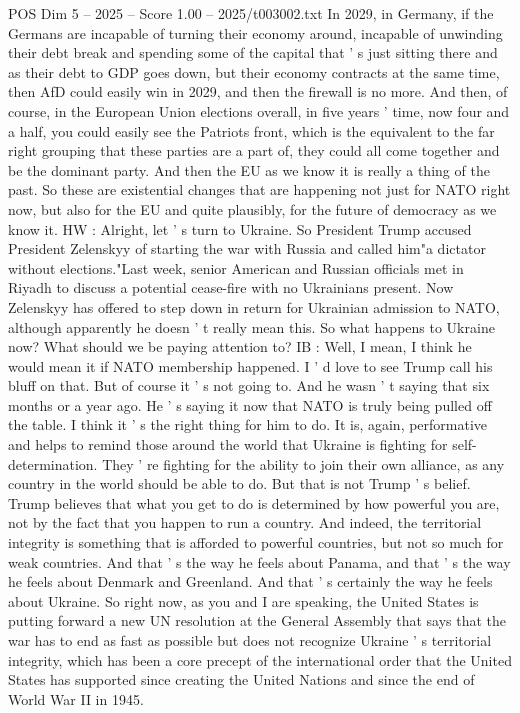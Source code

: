 \begin{textsample}{POS Dim 5 – 2025 – Score 1.00 – 2025/t003002.txt}
In 2029, in Germany, if the Germans are incapable of turning their economy around, incapable of unwinding their debt break and spending some of the capital that ' s just sitting there and as their debt to GDP goes down, but their economy contracts at the same time, then AfD could easily win in 2029, and then the firewall is no more.
And then, of course, in the European Union elections overall, in five years ' time, now four and a half, you could easily see the Patriots front, which is the equivalent to the far right grouping that these parties are a part of, they could all come together and be the dominant party.
And then the EU as we know it is really a thing of the past.
So these are existential changes that are happening not just for NATO right now, but also for the EU and quite plausibly, for the future of democracy as we know it.
HW : Alright, let ' s turn to Ukraine.
So President Trump accused President Zelenskyy of starting the war with Russia and called him"a dictator without elections."Last week, senior American and Russian officials met in Riyadh to discuss a potential cease-fire with no Ukrainians present.
Now Zelenskyy has offered to step down in return for Ukrainian admission to NATO, although apparently he doesn ' t really mean this.
So what happens to Ukraine now?
What should we be paying attention to?
IB : Well, I mean, I think he would mean it if NATO membership happened.
I ' d love to see Trump call his bluff on that.
But of course it ' s not going to.
And he wasn ' t saying that six months or a year ago.
He ' s saying it now that NATO is truly being pulled off the table.
I think it ' s the right thing for him to do.
It is, again, performative and helps to remind those around the world that Ukraine is fighting for self-determination.
They ' re fighting for the ability to join their own alliance, as any country in the world should be able to do.
But that is not Trump ' s belief.
Trump believes that what you get to do is determined by how powerful you are, not by the fact that you happen to run a country.
And indeed, the territorial integrity is something that is afforded to powerful countries, but not so much for weak countries.
And that ' s the way he feels about Panama, and that ' s the way he feels about Denmark and Greenland.
And that ' s certainly the way he feels about Ukraine.
So right now, as you and I are speaking, the United States is putting forward a new UN resolution at the General Assembly that says that the war has to end as fast as possible but does not recognize Ukraine ' s territorial integrity, which has been a core precept of the international order that the United States has supported since creating the United Nations and since the end of World War II in 1945.

\end{textsample}
